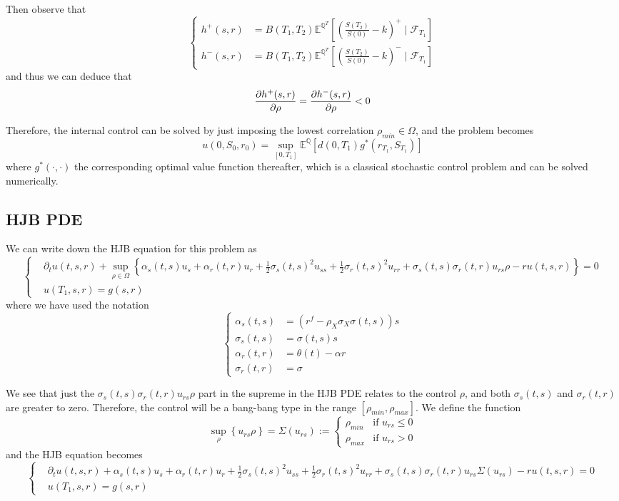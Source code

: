 \documentclass[11pt]{article}
\numberwithin{equation}{section}
\theoremstyle{remark}
\begin{document}
Then observe that
$$
\left\{
\begin{array}{ll}
h^+(s, r) & = B(T_1, T_2) \mathbb{E}^{\mathbb{Q}^T} \left[\left(\frac{S(T_2)}{S(0)}-k\right)^+ \mid \mathcal{F}_{T_1} \right]\\
h^-(s, r) & = B(T_1, T_2) \mathbb{E}^{\mathbb{Q}^T} \left[\left(\frac{S(T_2)}{S(0)}-k\right)^- \mid \mathcal{F}_{T_1} \right]
\end{array}
\right.
$$
and thus we can deduce that
$$\pdv{h^+(s, r)}{\rho} = \pdv{h^-(s, r)}{\rho} < 0$$

Therefore, the internal control can be solved by just imposing the lowest correlation $\rho_{min} \in \Omega$, and the problem becomes
$$u(0, S_0, r_0) = \sup_{[0,T_1]} \mathbb{E}^\mathbb{Q}\left[d(0,T_1) g^*(r_{T_1},S_{T_1}) \right]$$
where $g^*(\cdot, \cdot)$ the corresponding optimal value function thereafter, which is a classical stochastic control problem and can be solved numerically.

\subsection{HJB PDE}\label{5.3}
We can write down the HJB equation for this problem as
$$
\left\{
\begin{array}{ll}
& \partial_tu(t,s,r) + \sup_{\rho\in \Omega} \left\{\alpha_s(t,s)u_s +\alpha_r(t,r)u_r +\frac{1}{2}\sigma_s(t,s)^2u_{ss} +\frac{1}{2}\sigma_r(t,s)^2u_{rr} +\sigma_s(t,s)\sigma_r(t,r)u_{rs}\rho - ru(t,s,r)    \right\} =0 \\
& u(T_1,s,r)=g(s,r)
\end{array}
\right.
$$
where we have used the notation
$$
\left\{
\begin{array}{ll}
\alpha_s(t,s) & = \left( r^f - \rho_X \sigma_X \sigma(t,s) \right) s\\
\sigma_s(t,s) & = \sigma(t,s) s\\
\alpha_r(t,r) & = \theta(t)-\alpha r\\
\sigma_r(t,r) & = \sigma
\end{array}
\right.
$$

We see that just the $\sigma_s(t,s)\sigma_r(t,r)u_{rs}\rho$ part in the supreme in the HJB PDE relates to the control $\rho$, and both $\sigma_s(t,s)$ and $\sigma_r(t,r)$ are greater to zero. Therefore, the control will be a bang-bang type in the range $[\rho_{min}, \rho_{max}]$. We define the function
$$
\sup_{\rho} \left\{ u_{rs} \rho \right\} = \Sigma(u_{rs}) := 
\left\{
\begin{array}{ll}
\rho_{min} & \text{if } u_{rs} \leq 0\\
\rho_{max} & \text{if } u_{rs} > 0
\end{array}
\right.
$$
and the HJB equation becomes
$$
\left\{
\begin{array}{ll}
& \partial_tu(t,s,r) + \alpha_s(t,s)u_s +\alpha_r(t,r)u_r +\frac{1}{2}\sigma_s(t,s)^2u_{ss} +\frac{1}{2}\sigma_r(t,s)^2u_{rr} +\sigma_s(t,s)\sigma_r(t,r)u_{rs} \Sigma(u_{rs}) - ru(t,s,r) =0 \\
& u(T_1,s,r)=g(s,r)
\end{array}
\right.
$$
\end{document}
